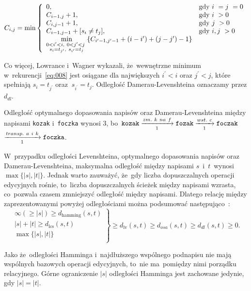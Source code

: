 \documentclass{praca1}
\begin{document}
\begin{equation}
\label{eq:008}
C_{i,j} = \min\left\{
\begin{array}{l l}     
    0, & \text{gdy } i~= j~= 0\\
    C_{i-1, j} + 1, & \text{gdy } i~> 0 \\
    C_{i, j-1} + 1, & \text{gdy } j~> 0 \\
    C_{i-1, j-1} + [s_{i}\neq t_{j}], & \text{gdy } i, j~> 0 \\
    \min\limits_{\substack{0 < i^{\prime} < i,\ 0 < j^{\prime} < j~ \\ s_i = t_{j^{\prime}},\ s_{i^{\prime}} = t_j}} \{C_{i^{\prime}-1, j^{\prime}-1} + (i-i^{\prime}) + (j-j^{\prime}) - 1\}
\end{array}\right.
\end{equation}

Co więcej, Lowrance i~Wagner wykazali, że~wewnętrzne minimum w~rekurencji~\eqref{eq:008} jest osiągane dla największych $i^{\prime} < i$ oraz $j^{\prime} < j$, które spełniają $s_i = t_{j^{\prime}}$ oraz $\ s_{i^{\prime}} = t_j$. Odległość Damerau-Levenshteina oznaczamy przez $d_{dl}$.

\begin{example}
Odległość optymalnego dopasowania napisów oraz Damerau-Levenshteina między napisami \verb|kozak| i~\verb|foczka| wynosi $3$, bo~$\verb|kozak| \xrightarrow[1]{zm.\ k\ na\ f} \verb|fozak|  \xrightarrow[1]{wst.\ c} \verb|foczak|$ $\xrightarrow[1]{transp.\ a\ i\ k} \verb|foczka|$.
\end{example}

W~przypadku odległości Levenshteina, optymalnego dopasowania napisów oraz Damerau-Levenshteina, maksymalna odległość między napisami $s$~i~$t$~wynosi $\max\{|s|, |t|\}$. Jednak warto zauważyć, że~gdy liczba dopuszczalnych operacji edycyjnych rośnie, to~liczba dopuszczalnych ścieżek między napisami wzrasta, co~pozwala czasem zmniejszyć odległość między napisami. Dlatego relację między zaprezentowanymi powyżej odległościami można podsumować następująco~\cite{Loo2014:stringdist}:
$$
\left. \begin{array}{r}
\infty (\geq |s|) \geq d_{\mathrm{hamming}}(s,t) \\
|s| + |t| \geq d_{\mathrm{lcs}}(s,t) \\
\max\{|s|, |t|\} \\
\end{array} \right \}
\geq d_{\mathrm{lv}}(s,t) \geq d_{osa}(s,t) \geq d_{dl}(s,t) \geq 0.
$$

Jako że~odległości Hamminga i~najdłuższego wspólnego podnapisu nie mają wspólnych bazowych operacji edycyjnych, to~nie ma~pomiędzy nimi porządku relacyjnego. Górne ograniczenie $|s|$ odległości Hamminga jest zachowane jedynie, gdy $|s| = |t|$.
\end{document}
